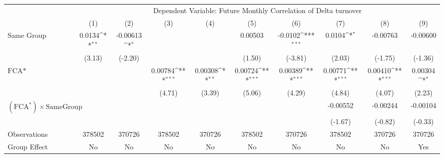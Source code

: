 {
\def\sym#1{\ifmmode^{#1}\else\(^{#1}\)\fi}
\begin{tabular}{l*{9}{c}}
\hline\hline
                &\multicolumn{9}{c}{Dependent Variable: Future Monthly Correlation of Delta turnover}                                                                                      \\\cmidrule(lr){2-10}
                &\multicolumn{1}{c}{(1)}         &\multicolumn{1}{c}{(2)}         &\multicolumn{1}{c}{(3)}         &\multicolumn{1}{c}{(4)}         &\multicolumn{1}{c}{(5)}         &\multicolumn{1}{c}{(6)}         &\multicolumn{1}{c}{(7)}         &\multicolumn{1}{c}{(8)}         &\multicolumn{1}{c}{(9)}         \\
\hline
Same Group      &   0.0134\sym{**} & -0.00613\sym{*}  &                  &                  &  0.00503         &  -0.0102\sym{***}&   0.0104\sym{*}  & -0.00763         & -0.00600         \\
                &   (3.13)         &  (-2.20)         &                  &                  &   (1.50)         &  (-3.81)         &   (2.03)         &  (-1.75)         &  (-1.36)         \\
[1em]
$ \text{FCA*} $ &                  &                  &  0.00784\sym{***}&  0.00308\sym{**} &  0.00724\sym{***}&  0.00389\sym{***}&  0.00771\sym{***}&  0.00410\sym{***}&  0.00304\sym{*}  \\
                &                  &                  &   (4.71)         &   (3.39)         &   (5.06)         &   (4.29)         &   (4.84)         &   (4.07)         &   (2.23)         \\
[1em]
 $ (\text{FCA}^*) \times {\text{SameGroup} }  $ &                  &                  &                  &                  &                  &                  & -0.00552         & -0.00244         & -0.00104         \\
                &                  &                  &                  &                  &                  &                  &  (-1.67)         &  (-0.82)         &  (-0.33)         \\
\hline
Observations    &   378502         &   370726         &   378502         &   370726         &   378502         &   370726         &   378502         &   370726         &   370726         \\
Group Effect    &       No         &       No         &       No         &       No         &       No         &       No         &       No         &       No         &      Yes         \\

\end{tabular}}

